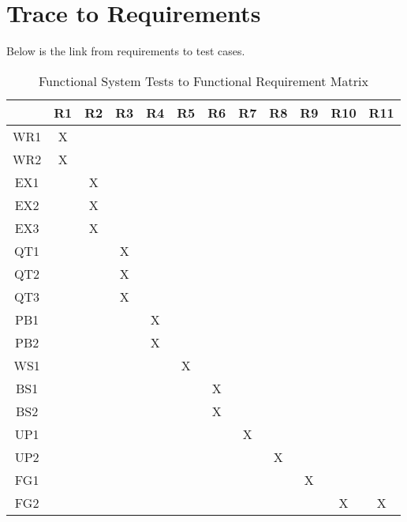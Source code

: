 \documentclass[12pt, titlepage]{article}
\begin{document}
\section{Trace to Requirements}
Below is the link from requirements to test cases.
\begin{table}[H]
	\centering
	\begin{tabular}{|c|c|c|c|c|c|c|c|c|c|c|c|}
		\hline
		& R1 & R2 & R3 & R4 & R5 & R6 & R7 & R8 & R9 & R10 & R11 \\ \hline
		WR1 &X & & & & & & & & & & \\ \hline
		WR2 &X & & & & & & & & & & \\ \hline
		EX1 & &X & & & & & & & & & \\ \hline 
		EX2 & &X & & & & & & & & & \\ \hline
		EX3 & &X & & & & & & & & &\\ \hline 
		QT1 & & &X & & & & & & & & \\ \hline 
		QT2 & & &X & & & & & & & & \\ \hline 
		QT3 & & &X & & & & & & & & \\ \hline 
		PB1 & & & &X & & & & & & & \\ \hline 
		PB2 & & & &X & & & & & & & \\ \hline 
		WS1 & & & & &X & & & & & & \\ \hline 
		BS1 & & & & & &X & & & & & \\ \hline 
		BS2 & & & & & &X & & & & & \\ \hline 
		UP1 & & & & & & &X & & & & \\ \hline 
		UP2 & & & & & & & &X & & & \\ \hline 
		FG1 & & & & & & & & &X & & \\ \hline 
		FG2 & & & & & & & & & &X &X \\ \hline 	
	\end{tabular}
	\caption{Functional System Tests to Functional Requirement Matrix}
	\label{Table:R_trace}
\end{table}
\end{document}
